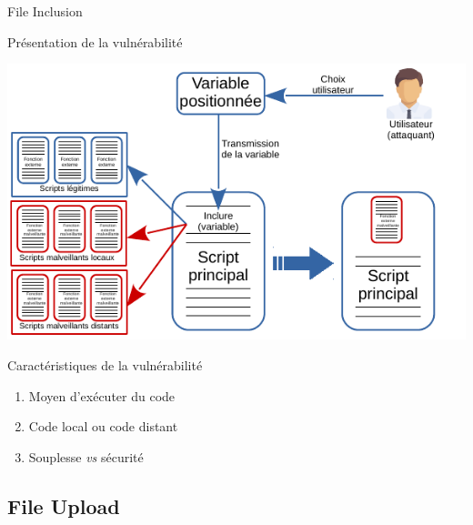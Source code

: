 \documentclass[8pt]{beamer}
\begin{document}
\begin{frame}{File Inclusion}

\begin{block}{Présentation de la vulnérabilité}

\begin{center}
	\includegraphics[scale=.8]{../images/include_hacked.pdf}
\end{center}

\end{block}

\begin{block}{Caractéristiques de la vulnérabilité}
	\begin{enumerate}[\ding{217}]
		\item Moyen d'exécuter du code
		\item Code local ou code distant
		\item Souplesse \textit{vs} sécurité
	\end{enumerate}
\end{block}

\end{frame}

\subsection{File Upload}
\end{document}
